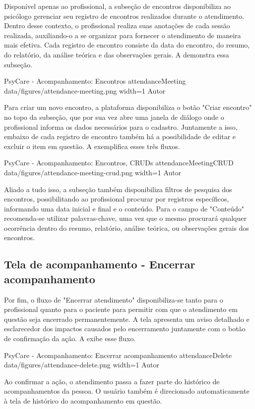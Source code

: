 Disponível apenas ao profissional, a subseção de encontros disponibiliza ao psicólogo gerenciar seu registro de encontros realizados durante o atendimento. Dentro desse contexto, o profissional realiza suas anotações de cada sessão realizada, auxiliando-o a se organizar para fornecer o atendimento de maneira mais efetiva. Cada registro de encontro consiste da data do encontro, do resumo, do relatório, da análise teórica e das observações gerais. A  demonstra essa subseção.

\image
    {PsyCare - Acompanhamento: Encontros}
    {attendanceMeeting}
    {data/figures/attendance-meeting.png}
    {width=1\textwidth}
    {Autor}

Para criar um novo encontro, a plataforma disponibiliza o botão "Criar encontro" no topo da subseção, que por sua vez abre uma janela de diálogo onde o profissional informa os dados necessários para o cadastro. Juntamente a isso, embaixo de cada registro de encontro também há a possibilidade de editar e excluir o item em questão. A  exemplifica esses três fluxos.

\image
    {PsyCare - Acompanhamento: Encontros, CRUDs}
    {attendanceMeetingCRUD}
    {data/figures/attendance-meeting-crud.png}
    {width=1\textwidth}
    {Autor}

Aliado a tudo isso, a subseção também disponibiliza filtros de pesquisa dos encontros, possibilitando ao profissional procurar por registros específicos, informando uma data inicial e final e o conteúdo. Para o campo de "Conteúdo" recomenda-se utilizar palavras-chave, uma vez que o mesmo procurará qualquer ocorrência dentro do resumo, relatório, análise teórica, ou observações gerais dos encontros.

\subsection{Tela de acompanhamento - Encerrar acompanhamento}
\label{sec:acompanhamentoEncerrar}

Por fim, o fluxo de "Encerrar atendimento" disponibiliza-se tanto para o profissional quanto para o paciente para permitir com que o atendimento em questão seja encerrado permanentemente. A tela apresenta um aviso detalhado e esclarecedor dos impactos causados pelo encerramento juntamente com o botão de confirmação da ação. A  exibe esse fluxo.

\image
    {PsyCare - Acompanhamento: Encerrar acompanhamento}
    {attendanceDelete}
    {data/figures/attendance-delete.png}
    {width=1\textwidth}
    {Autor}

Ao confirmar a ação, o atendimento passa a fazer parte do histórico de acompanhamentos da pessoa. O usuário também é direcionado automaticamente à tela de histórico do acompanhamento em questão.